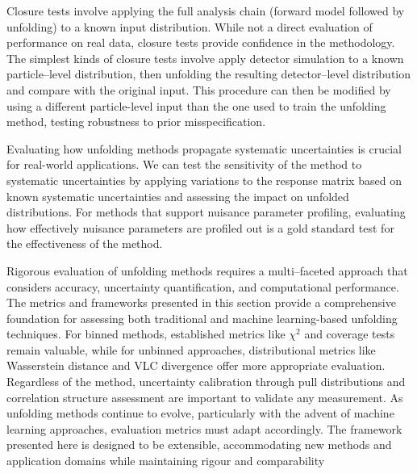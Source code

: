         Closure tests involve applying the full analysis chain (forward model followed by unfolding) to a known input distribution.
        While not a direct evaluation of performance on real data, closure tests provide confidence in the methodology.
        The simplest kinds of closure tests involve apply detector simulation to a known particle--level distribution, then unfolding the resulting detector--level distribution and compare with the original input.
        This procedure can then be modified by using a different particle-level input than the one used to train the unfolding method, testing robustness to prior misspecification.
        
        Evaluating how unfolding methods propagate systematic uncertainties is crucial for real-world applications.
        We can test the sensitivity of the method to systematic uncertainties by applying variations to the response matrix based on known systematic uncertainties and assessing the impact on unfolded distributions.
        For methods that support nuisance parameter profiling, evaluating how effectively nuisance parameters are profiled out is a gold standard test for the effectiveness of the method.
        
        Rigorous evaluation of unfolding methods requires a multi--faceted approach that considers accuracy, uncertainty quantification, and computational performance.
        The metrics and frameworks presented in this section provide a comprehensive foundation for assessing both traditional and machine learning-based unfolding techniques.
        For binned methods, established metrics like \(\chi^2\) and coverage tests remain valuable, while for unbinned approaches, distributional metrics like Wasserstein distance and VLC divergence offer more appropriate evaluation.
        Regardless of the method, uncertainty calibration through pull distributions and correlation structure assessment are important to validate any measurement.
        As unfolding methods continue to evolve, particularly with the advent of machine learning approaches, evaluation metrics must adapt accordingly.
        The framework presented here is designed to be extensible, accommodating new methods and application domains while maintaining rigour and comparability

